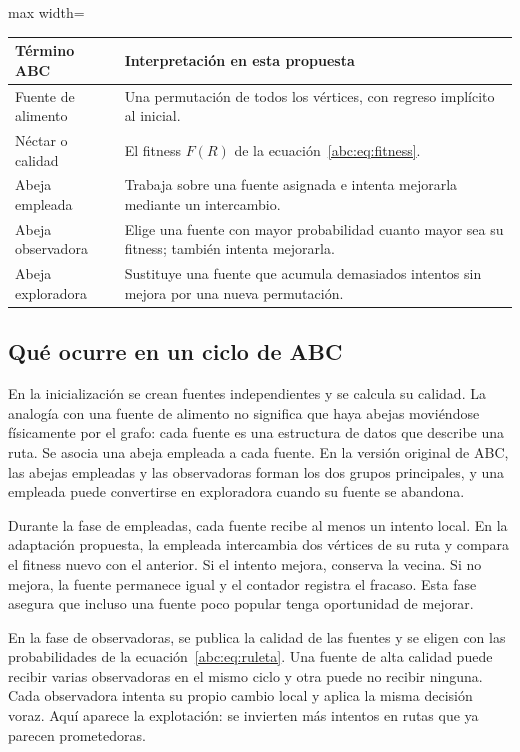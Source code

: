 \begin{center}
\begin{adjustbox}{max width=\linewidth}
\begin{tabular}{p{3.2cm}p{10.0cm}}
\toprule
Término ABC & Interpretación en esta propuesta\\
\midrule
Fuente de alimento & Una permutación de todos los vértices, con regreso implícito al inicial.\\
Néctar o calidad & El fitness $F(R)$ de la ecuación~\eqref{abc:eq:fitness}.\\
Abeja empleada & Trabaja sobre una fuente asignada e intenta mejorarla mediante un intercambio.\\
Abeja observadora & Elige una fuente con mayor probabilidad cuanto mayor sea su fitness; también intenta mejorarla.\\
Abeja exploradora & Sustituye una fuente que acumula demasiados intentos sin mejora por una nueva permutación.\\
\bottomrule
\end{tabular}
\end{adjustbox}
\end{center}

\subsection{Qué ocurre en un ciclo de ABC}
En la inicialización se crean fuentes independientes y se calcula su calidad. La analogía con una fuente de alimento no significa que haya abejas moviéndose físicamente por el grafo: cada fuente es una estructura de datos que describe una ruta. Se asocia una abeja empleada a cada fuente. En la versión original de ABC, las abejas empleadas y las observadoras forman los dos grupos principales, y una empleada puede convertirse en exploradora cuando su fuente se abandona.\cite{abc7}

Durante la fase de empleadas, cada fuente recibe al menos un intento local. En la adaptación propuesta, la empleada intercambia dos vértices de su ruta y compara el fitness nuevo con el anterior. Si el intento mejora, conserva la vecina. Si no mejora, la fuente permanece igual y el contador registra el fracaso. Esta fase asegura que incluso una fuente poco popular tenga oportunidad de mejorar.

En la fase de observadoras, se publica la calidad de las fuentes y se eligen con las probabilidades de la ecuación~\eqref{abc:eq:ruleta}. Una fuente de alta calidad puede recibir varias observadoras en el mismo ciclo y otra puede no recibir ninguna. Cada observadora intenta su propio cambio local y aplica la misma decisión voraz. Aquí aparece la explotación: se invierten más intentos en rutas que ya parecen prometedoras.\cite{abc8}

